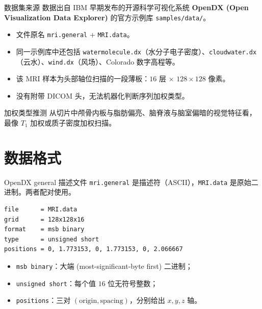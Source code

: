\documentclass[aspectratio=169,11pt]{ctexbeamer}
\begin{document}
\begin{frame}{数据集来源}
  \small
  数据出自 IBM 早期发布的开源科学可视化系统 \textbf{OpenDX (Open Visualization Data Explorer)} 的官方示例库 \texttt{samples/data/}。

  \begin{itemize}
    \item 文件原名 \texttt{mri.general} + \texttt{MRI.data}。
    \item 同一示例库中还包括 \texttt{watermolecule.dx}（水分子电子密度）、\texttt{cloudwater.dx}（云水）、\texttt{wind.dx}（风场）、Colorado 数字高程等。
    \item 该 MRI 样本为头部轴位扫描的一段薄板：$16$ 层 $\times$ $128\times128$ 像素。
    \item 没有附带 DICOM 头，无法机器化判断序列加权类型。
  \end{itemize}

  \begin{block}{加权类型推测}
    从切片中颅骨内板与脂肪偏亮、脑脊液与脑室偏暗的视觉特征看，最像 $T_1$ 加权或质子密度加权扫描。
  \end{block}
\end{frame}

\section{数据格式}

\begin{frame}[fragile]{OpenDX general 描述文件}
  \small
  \texttt{mri.general} 是描述符（ASCII），\texttt{MRI.data} 是原始二进制。两者配对使用。

  \begin{Verbatim}[fontsize=\scriptsize,frame=single]
file      = MRI.data
grid      = 128x128x16
format    = msb binary
type      = unsigned short
positions = 0, 1.773153, 0, 1.773153, 0, 2.066667
  \end{Verbatim}

  \begin{itemize}
    \item \texttt{msb binary}：大端 (most-significant-byte first) 二进制；
    \item \texttt{unsigned short}：每个值 $16$ 位无符号整数；
    \item \texttt{positions}：三对 $(\text{origin}, \text{spacing})$，分别给出 $x,y,z$ 轴。
  \end{itemize}
\end{frame}
\end{document}
